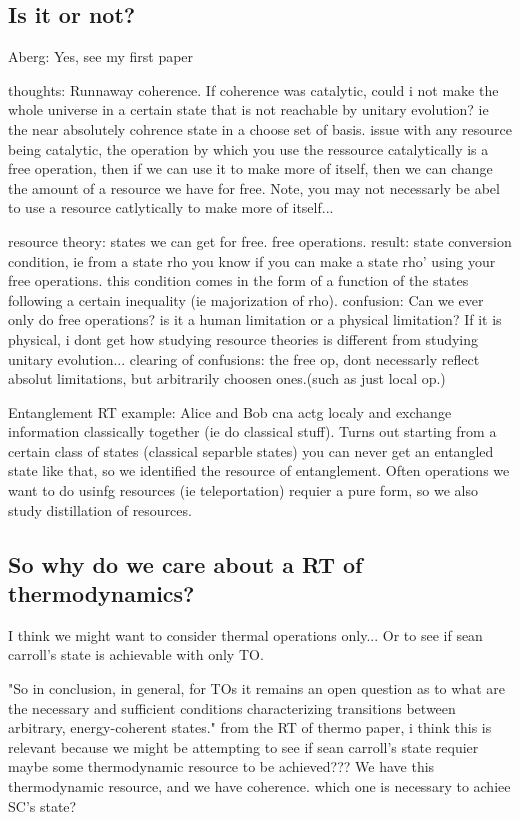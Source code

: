 \documentclass{article}
\begin{document}
\subsection*{Is it or not?}

Aberg: Yes, see my first paper


thoughts: Runnaway coherence. If coherence was catalytic, could i not make the whole universe in a certain state that is not reachable by unitary evolution? ie the near absolutely cohrence state in a choose set of basis.
issue with any resource being catalytic, the operation by which you use the ressource catalytically is a free operation, then if we can use it to make more of itself, then we can change the amount of a resource we have for free.
Note, you may not necessarly be abel to use a resource catlytically to make more of itself...

resource theory: states we can get for free. free operations. 
result: state conversion condition, ie from a state rho you know if you can make a state rho' using your free operations. this condition comes in the form of a function of the states following a certain inequality (ie majorization of rho).
confusion: Can we ever only do free operations? is it a human limitation or a physical limitation? If it is physical, i dont get how studying resource theories is different from studying unitary evolution...
clearing of confusions: the free op, dont necessarly reflect absolut limitations, but arbitrarily choosen ones.(such as just local op.)

Entanglement RT example: Alice and Bob cna actg localy and exchange information classically together (ie do classical stuff). Turns out starting from a certain class of states (classical separble states) you can never get an entangled state like that, so we identified the resource of entanglement.
Often operations we want to do usinfg resources (ie teleportation) requier a pure form, so we also study distillation of resources. 

\subsection{So why do we care about a RT of thermodynamics?} 

I think we might want to consider thermal operations only... Or to see if sean carroll's state is achievable with only TO.

"So in conclusion, in general, for TOs it remains an open question as to what are the necessary and sufficient conditions characterizing transitions between arbitrary, energy-coherent states."
from the RT of thermo paper, i think this is relevant because we might be attempting to see if sean carroll's state requier maybe some thermodynamic resource to be achieved??? 
We have this thermodynamic resource, and we have coherence. which one is necessary to achiee SC's state?
\end{document}
